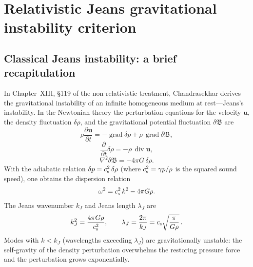 
\section{Relativistic Jeans gravitational instability criterion}
\label{sec:rel-13-119}

\subsection{Classical Jeans instability: a brief recapitulation}
\label{sec:rel-13-119a}

In Chapter~XIII, \S119 of the non-relativistic treatment,
Chandrasekhar derives the gravitational instability of an infinite
homogeneous medium at rest---Jeans's instability.  In the Newtonian
theory the perturbation equations for the velocity $\mathbf{u}$,
the density fluctuation $\delta\rho$, and the gravitational
potential fluctuation $\delta\mathfrak{B}$ are
\begin{equation}
\label{eq:rel-13-79}
  \rho\frac{\partial\mathbf{u}}{\partial t}
  = -\operatorname{grad}\delta p
    + \rho\,\operatorname{grad}\delta\mathfrak{B},
\end{equation}
\begin{equation}
\label{eq:rel-13-80}
  \frac{\partial}{\partial t}\delta\rho
  = -\rho\,\operatorname{div}\mathbf{u},
\end{equation}
\begin{equation}
\label{eq:rel-13-81}
  \nabla^{2}\delta\mathfrak{B} = -4\pi G\,\delta\rho.
\end{equation}
With the adiabatic relation $\delta p = c_{\mathrm{s}}^{2}\,\delta\rho$
(where $c_{\mathrm{s}}^{2}=\gamma p/\rho$ is the squared sound speed), one
obtains the dispersion relation
\begin{equation}
\label{eq:rel-13-87-cl}
  \omega^{2} = c_{\mathrm{s}}^{2}\,k^{2} - 4\pi G\rho.
\end{equation}
The Jeans wavenumber $k_{J}$ and Jeans length $\lambda_{J}$ are
\begin{equation}
\label{eq:jeans-classical}
  k_{J}^{2} = \frac{4\pi G\rho}{c_{\mathrm{s}}^{2}},
  \qquad
  \lambda_{J}
  = \frac{2\pi}{k_{J}}
  = c_{\mathrm{s}}\sqrt{\frac{\pi}{G\rho}}\,.
\end{equation}
Modes with $k < k_{J}$ (wavelengths exceeding $\lambda_{J}$)
are gravitationally unstable: the self-gravity of the density
perturbation overwhelms the restoring pressure force and the
perturbation grows exponentially.

